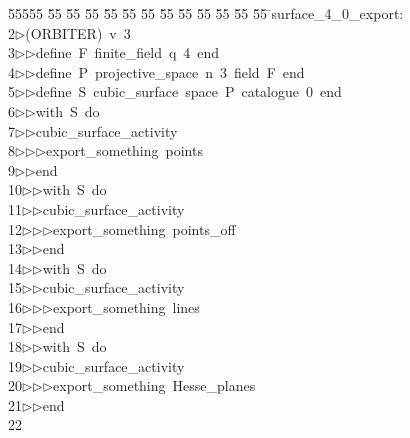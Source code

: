%
%
\begin{tabbing}
55555 \= 55 \= 55 \= 55 \= 55 \= 55 \= 55 \= 55 \= 55 \= 55 \= 55 \= 55 \= 55 \= \>surface\_4\_0\_export:\\[0pt]
2\>$\triangleright$\>(ORBITER)\ v\ 3\ \\[0pt]
3\>$\triangleright$\>$\triangleright$\>define\ F\ finite\_field\ q\ 4\ end\ \\[0pt]
4\>$\triangleright$\>$\triangleright$\>define\ P\ projective\_space\ n\ 3\ field\ F\ end\ \\[0pt]
5\>$\triangleright$\>$\triangleright$\>define\ S\ cubic\_surface\ space\ P\ catalogue\ 0\ end\ \\[0pt]
6\>$\triangleright$\>$\triangleright$\>with\ S\ do\ \\[0pt]
7\>$\triangleright$\>$\triangleright$\>cubic\_surface\_activity\ \\[0pt]
8\>$\triangleright$\>$\triangleright$\>$\triangleright$\>export\_something\ points\ \\[0pt]
9\>$\triangleright$\>$\triangleright$\>end\ \\[0pt]
10\>$\triangleright$\>$\triangleright$\>with\ S\ do\ \\[0pt]
11\>$\triangleright$\>$\triangleright$\>cubic\_surface\_activity\ \\[0pt]
12\>$\triangleright$\>$\triangleright$\>$\triangleright$\>export\_something\ points\_off\ \\[0pt]
13\>$\triangleright$\>$\triangleright$\>end\ \\[0pt]
14\>$\triangleright$\>$\triangleright$\>with\ S\ do\ \\[0pt]
15\>$\triangleright$\>$\triangleright$\>cubic\_surface\_activity\ \\[0pt]
16\>$\triangleright$\>$\triangleright$\>$\triangleright$\>export\_something\ lines\ \\[0pt]
17\>$\triangleright$\>$\triangleright$\>end\ \\[0pt]
18\>$\triangleright$\>$\triangleright$\>with\ S\ do\ \\[0pt]
19\>$\triangleright$\>$\triangleright$\>cubic\_surface\_activity\ \\[0pt]
20\>$\triangleright$\>$\triangleright$\>$\triangleright$\>export\_something\ Hesse\_planes\ \\[0pt]
21\>$\triangleright$\>$\triangleright$\>end\\[0pt]
22\>\end{tabbing}
